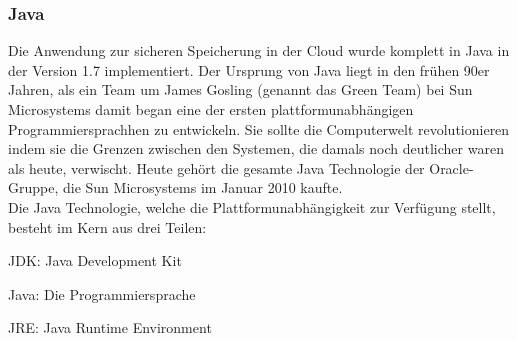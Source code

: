\documentclass[12pt,a4paper,bibliography=totocnumbered,listof=totocnumbered]{scrartcl}
\begin{document}
\subsubsection{Java}\label{JavaV}
Die Anwendung zur sicheren Speicherung in der Cloud wurde komplett in Java in der Version 1.7 implementiert. Der Ursprung von Java liegt in den frühen 90er Jahren, als ein Team um James Gosling (genannt das Green Team) bei Sun Microsystems damit began eine der ersten plattformunabhängigen Programmiersprachhen zu entwickeln. Sie sollte die Computerwelt revolutionieren indem sie die Grenzen zwischen den Systemen, die damals noch deutlicher waren als heute, verwischt. Heute gehört die gesamte Java Technologie der Oracle-Gruppe, die Sun Microsystems im Januar 2010 kaufte.\\
Die Java Technologie, welche die Plattformunabhängigkeit zur Verfügung stellt, besteht im Kern aus drei Teilen:
\begin{compactitem}
	\item JDK: Java Development Kit
	\item Java: Die Programmiersprache
	\item JRE: Java Runtime Environment
\end{compactitem}
\end{document}
